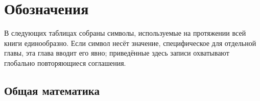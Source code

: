 
\chapter*{Обозначения}

В следующих таблицах собраны символы, используемые на протяжении всей книги единообразно. Если символ несёт значение, специфическое для отдельной главы, эта глава вводит его явно; приведённые здесь записи охватывают глобально повторяющиеся соглашения.

\section*{Общая математика}

